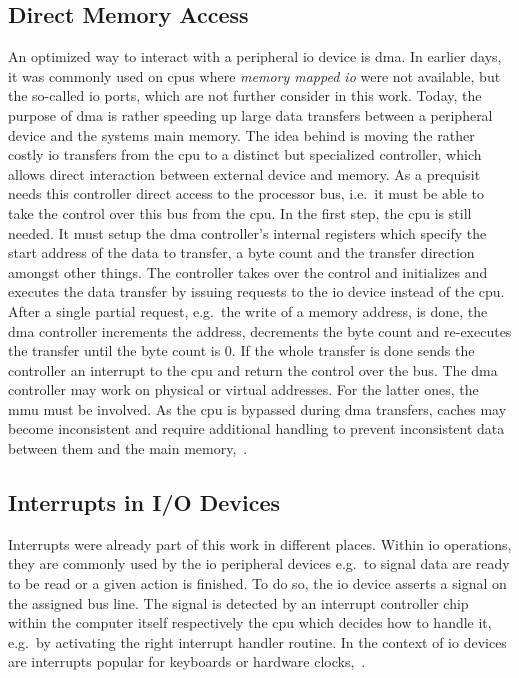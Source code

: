 \subsection{Direct Memory Access}
An optimized way to interact with a peripheral \ac{io} device is \acf{dma}.
In earlier days, it was commonly used on \acp{cpu} where \textit{memory mapped \ac{io}} were not available, but the so-called \ac{io} ports, which are not further consider in this work.
Today, the purpose of \ac{dma} is rather speeding up large data transfers between a peripheral device and the systems main memory.
The idea behind is moving the rather costly \ac{io} transfers from the \ac{cpu} to a distinct but specialized controller, which allows direct interaction between external device and memory.
As a prequisit needs this controller direct access to the processor bus, i.e.\ it must be able to take the control over this bus from the \ac{cpu}.
In the first step, the \ac{cpu} is still needed.
It must setup the \ac{dma} controller's internal registers which specify the start address of the data to transfer, a byte count and the transfer direction amongst other things.
The controller takes over the control and initializes and executes the data transfer by issuing requests to the \ac{io} device instead of the \ac{cpu}.
After a single partial request, e.g.\ the write of a memory address, is done, the \ac{dma} controller increments the address, decrements the byte count and re-executes the transfer until the byte count is 0.
If the whole transfer is done sends the controller an interrupt to the \ac{cpu} and return the control over the bus.
The \ac{dma} controller may work on physical or virtual addresses.
For the latter ones, the \ac{mmu} must be involved.
As the \ac{cpu} is bypassed during \ac{dma} transfers, caches may become inconsistent and require additional handling to prevent inconsistent data between them and the main memory\cite{tanenbaum-modern-operating-systems},~\cite{glatz2015betriebssysteme}.

\subsection{Interrupts in I/O Devices}
Interrupts were already part of this work in different places.
Within \ac{io} operations, they are commonly used by the \ac{io} peripheral devices e.g.\ to signal data are ready to be read or a given action is finished.
To do so, the \ac{io} device asserts a signal on the assigned bus line.
The signal is detected by an interrupt controller chip within the computer itself respectively the \ac{cpu} which decides how to handle it, e.g.\ by activating the right interrupt handler routine.
In the context of \ac{io} devices are interrupts popular for keyboards or hardware clocks\cite{tanenbaum-modern-operating-systems},~\cite{glatz2015betriebssysteme}.


